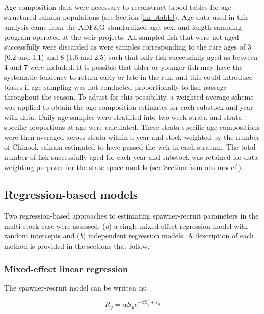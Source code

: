 \documentclass[12pt,]{book}
\theoremstyle{definition}
\theoremstyle{definition}
\theoremstyle{definition}
\theoremstyle{remark}
\begin{document}
Age composition data were necessary to reconstruct brood tables for
age-structured salmon populations (see Section \ref{lm-btable}). Age
data used in this analysis came from the ADF\&G standardized age, sex,
and length sampling program operated at the weir projects. All sampled
fish that were not aged successfully were discarded as were samples
corresponding to the rare ages of 3 (0.2 and 1.1) and 8 (1.6 and 2.5)
such that only fish successfully aged as between 4 and 7 were included.
It is possible that older or younger fish may have the systematic
tendency to return early or late in the run, and this could introduce
biases if age sampling was not conducted proportionally to fish passage
throughout the season. To adjust for this possibility, a
weighted-average scheme was applied to obtain the age composition
estimates for each substock and year with data. Daily age samples were
stratified into two-week strata and strata-specific proportions-at-age
were calculated. These strata-specific age compositions were then
averaged across strata within a year and stock weighted by the number of
Chinook salmon estimated to have passed the weir in each stratum. The
total number of fish successfully aged for each year and substock was
retained for data-weighting purposes for the state-space models (see
Section \ref{ssm-obs-model}).

\subsection{Regression-based models}\label{reg-methods}

\noindent
Two regression-based approaches to estimating \citet{ricker-1954}
spawner-recruit parameters in the multi-stock case were assessed:
(\emph{a}) a single mixed-effect regression model with random intercepts
and (\emph{b}) independent regression models. A description of each
method is provided in the sections that follow.

\subsubsection{Mixed-effect linear regression}\label{lme-methods}

\noindent
The \citet{ricker-1954} spawner-recruit model can be written as:

\begin{equation}
  R_y=\alpha S_y e^{-\beta S_y + \varepsilon_y}
  \label{eq:basic-ricker}
\end{equation}
\end{document}

